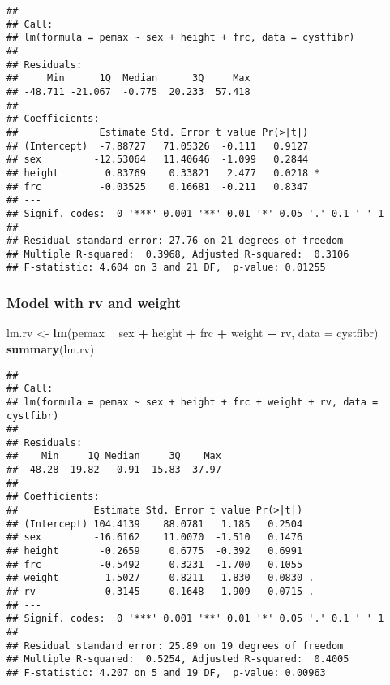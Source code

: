 \documentclass[]{article}
\newenvironment{Shaded}{\begin{snugshade}}{\end{snugshade}}
\newcommand{\DataTypeTok}[1]{\textcolor[rgb]{0.13,0.29,0.53}{#1}}
\newcommand{\KeywordTok}[1]{\textcolor[rgb]{0.13,0.29,0.53}{\textbf{#1}}}
\newcommand{\NormalTok}[1]{#1}
\newcommand{\OperatorTok}[1]{\textcolor[rgb]{0.81,0.36,0.00}{\textbf{#1}}}
\newcommand{\StringTok}[1]{\textcolor[rgb]{0.31,0.60,0.02}{#1}}
\begin{document}
\begin{verbatim}
## 
## Call:
## lm(formula = pemax ~ sex + height + frc, data = cystfibr)
## 
## Residuals:
##     Min      1Q  Median      3Q     Max 
## -48.711 -21.067  -0.775  20.233  57.418 
## 
## Coefficients:
##              Estimate Std. Error t value Pr(>|t|)  
## (Intercept)  -7.88727   71.05326  -0.111   0.9127  
## sex         -12.53064   11.40646  -1.099   0.2844  
## height        0.83769    0.33821   2.477   0.0218 *
## frc          -0.03525    0.16681  -0.211   0.8347  
## ---
## Signif. codes:  0 '***' 0.001 '**' 0.01 '*' 0.05 '.' 0.1 ' ' 1
## 
## Residual standard error: 27.76 on 21 degrees of freedom
## Multiple R-squared:  0.3968, Adjusted R-squared:  0.3106 
## F-statistic: 4.604 on 3 and 21 DF,  p-value: 0.01255
\end{verbatim}

\hypertarget{model-with-rv-and-weight}{%
\subsubsection{Model with rv and
weight}\label{model-with-rv-and-weight}}

\begin{Shaded}
\begin{Highlighting}[]
\NormalTok{lm.rv <-}\StringTok{ }\KeywordTok{lm}\NormalTok{(pemax }\OperatorTok{~}\StringTok{ }\NormalTok{sex }\OperatorTok{+}\StringTok{ }\NormalTok{height }\OperatorTok{+}\StringTok{ }\NormalTok{frc }\OperatorTok{+}\StringTok{ }\NormalTok{weight }\OperatorTok{+}\StringTok{ }\NormalTok{rv, }\DataTypeTok{data =}\NormalTok{ cystfibr)}
\KeywordTok{summary}\NormalTok{(lm.rv)}
\end{Highlighting}
\end{Shaded}

\begin{verbatim}
## 
## Call:
## lm(formula = pemax ~ sex + height + frc + weight + rv, data = cystfibr)
## 
## Residuals:
##    Min     1Q Median     3Q    Max 
## -48.28 -19.82   0.91  15.83  37.97 
## 
## Coefficients:
##             Estimate Std. Error t value Pr(>|t|)  
## (Intercept) 104.4139    88.0781   1.185   0.2504  
## sex         -16.6162    11.0070  -1.510   0.1476  
## height       -0.2659     0.6775  -0.392   0.6991  
## frc          -0.5492     0.3231  -1.700   0.1055  
## weight        1.5027     0.8211   1.830   0.0830 .
## rv            0.3145     0.1648   1.909   0.0715 .
## ---
## Signif. codes:  0 '***' 0.001 '**' 0.01 '*' 0.05 '.' 0.1 ' ' 1
## 
## Residual standard error: 25.89 on 19 degrees of freedom
## Multiple R-squared:  0.5254, Adjusted R-squared:  0.4005 
## F-statistic: 4.207 on 5 and 19 DF,  p-value: 0.00963
\end{verbatim}
\end{document}
